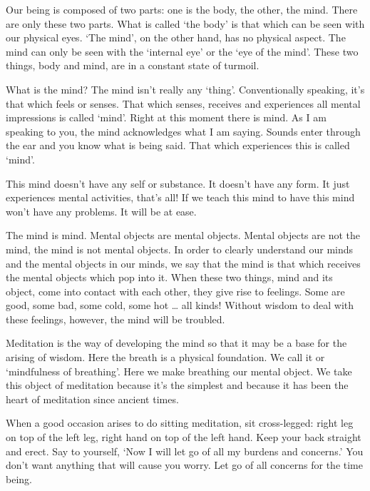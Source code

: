 Our being is composed of two parts: one is the body, the other, the mind. There are only these two parts. What is called `the body' is that which can be seen with our physical eyes. `The mind', on the other hand, has no physical aspect. The mind can only be seen with the `internal eye' or the `eye of the mind'. These two things, body and mind, are in a constant state of turmoil.

What is the mind? The mind isn't really any `thing'. Conventionally speaking, it's that which feels or senses. That which senses, receives and experiences all mental impressions is called `mind'. Right at this moment there is mind. As I am speaking to you, the mind acknowledges what I am saying. Sounds enter through the ear and you know what is being said. That which experiences this is called `mind'.

This mind doesn't have any self or substance. It doesn't have any form. It just experiences mental activities, that's all! If we teach this mind to have  this mind won't have any problems. It will be at ease.

The mind is mind. Mental objects are mental objects. Mental objects are not the mind, the mind is not mental objects. In order to clearly understand our minds and the mental objects in our minds, we say that the mind is that which receives the mental objects which pop into it. When these two things, mind and its object, come into contact with each other, they give rise to feelings. Some are good, some bad, some cold, some hot \ldots{} all kinds! Without wisdom to deal with these feelings, however, the mind will be troubled.

Meditation is the way of developing the mind so that it may be a base for the arising of wisdom. Here the breath is a physical foundation. We call it  or `mindfulness of breathing'. Here we make breathing our mental object. We take this object of meditation because it's the simplest and because it has been the heart of meditation since ancient times.

When a good occasion arises to do sitting meditation, sit cross-legged: right leg on top of the left leg, right hand on top of the left hand. Keep your back straight and erect. Say to yourself, `Now I will let go of all my burdens and concerns.' You don't want anything that will cause you worry. Let go of all concerns for the time being.

